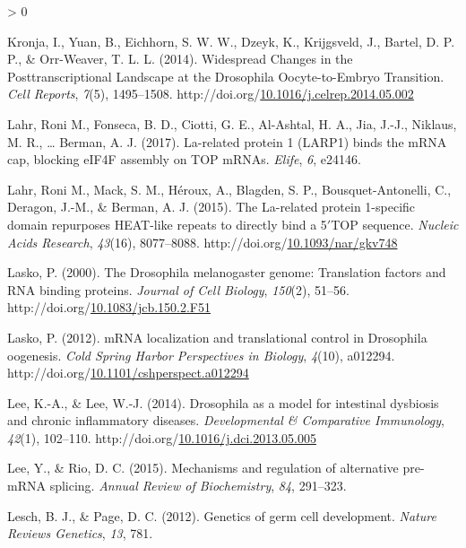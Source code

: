 \documentclass[12pt,oneside]{reedthesis}
\newlength{\cslhangindent}
\newenvironment{CSLReferences}[2] %
 {%
  \setlength{\parindent}{0pt}
  \ifodd #1 \everypar{\setlength{\hangindent}{\cslhangindent}}\ignorespaces\fi
  \ifnum #2 > 0
  \setlength{\parskip}{#2\baselineskip}
  \fi
 }%
 {}
\begin{document}
\begin{CSLReferences}{1}{0}
\leavevmode\hypertarget{ref-Kronja2014}{}%
Kronja, I., Yuan, B., Eichhorn, S. W. W., Dzeyk, K., Krijgsveld, J., Bartel, D. P. P., \& Orr-Weaver, T. L. L. (2014). Widespread {Changes} in the {Posttranscriptional Landscape} at the {Drosophila Oocyte}-to-{Embryo Transition}. \emph{Cell Reports}, \emph{7}(5), 1495--1508. http://doi.org/\href{https://doi.org/10.1016/j.celrep.2014.05.002}{10.1016/j.celrep.2014.05.002}

\leavevmode\hypertarget{ref-Lahr2017b}{}%
Lahr, Roni M., Fonseca, B. D., Ciotti, G. E., Al-Ashtal, H. A., Jia, J.-J., Niklaus, M. R., \ldots{} Berman, A. J. (2017). La-related protein 1 ({LARP1}) binds the {mRNA} cap, blocking {eIF4F} assembly on {TOP mRNAs}. \emph{Elife}, \emph{6}, e24146.

\leavevmode\hypertarget{ref-lahrLarelatedProtein1specific2015}{}%
Lahr, Roni M., Mack, S. M., Héroux, A., Blagden, S. P., Bousquet-Antonelli, C., Deragon, J.-M., \& Berman, A. J. (2015). The {La}-related protein 1-specific domain repurposes {HEAT}-like repeats to directly bind a 5{\({'}\)}{TOP} sequence. \emph{Nucleic Acids Research}, \emph{43}(16), 8077--8088. http://doi.org/\href{https://doi.org/10.1093/nar/gkv748}{10.1093/nar/gkv748}

\leavevmode\hypertarget{ref-Lasko2000}{}%
Lasko, P. (2000). The {Drosophila} melanogaster genome: {Translation} factors and {RNA} binding proteins. \emph{Journal of Cell Biology}, \emph{150}(2), 51--56. http://doi.org/\href{https://doi.org/10.1083/jcb.150.2.F51}{10.1083/jcb.150.2.F51}

\leavevmode\hypertarget{ref-Lasko2012a}{}%
Lasko, P. (2012). {mRNA} localization and translational control in {Drosophila} oogenesis. \emph{Cold Spring Harbor Perspectives in Biology}, \emph{4}(10), a012294. http://doi.org/\href{https://doi.org/10.1101/cshperspect.a012294}{10.1101/cshperspect.a012294}

\leavevmode\hypertarget{ref-Lee2014c}{}%
Lee, K.-A., \& Lee, W.-J. (2014). Drosophila as a model for intestinal dysbiosis and chronic inflammatory diseases. \emph{Developmental \& Comparative Immunology}, \emph{42}(1), 102--110. http://doi.org/\href{https://doi.org/10.1016/j.dci.2013.05.005}{10.1016/j.dci.2013.05.005}

\leavevmode\hypertarget{ref-Lee2015}{}%
Lee, Y., \& Rio, D. C. (2015). Mechanisms and regulation of alternative pre-{mRNA} splicing. \emph{Annual Review of Biochemistry}, \emph{84}, 291--323.

\leavevmode\hypertarget{ref-Lesch2012b}{}%
Lesch, B. J., \& Page, D. C. (2012). Genetics of germ cell development. \emph{Nature Reviews Genetics}, \emph{13}, 781.


\end{CSLReferences}
\end{document}
